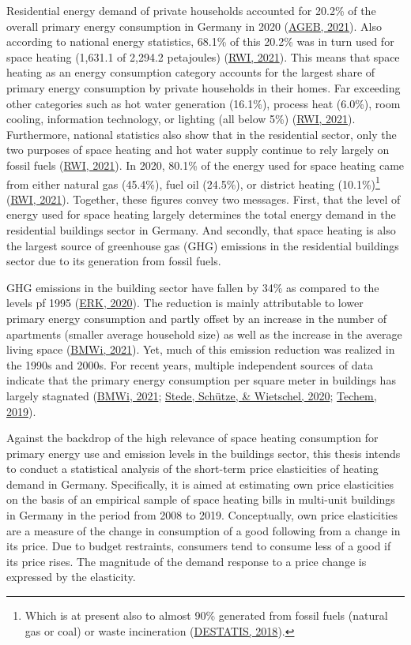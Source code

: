 \documentclass[12pt,twoside]{reedthesis}
\begin{document}
Residential energy demand of private households accounted for 20.2\% of the overall primary energy consumption in Germany in 2020 (\protect\hyperlink{ref-ageb21}{AGEB, 2021}). Also according to national energy statistics, 68.1\% of this 20.2\% was in turn used for space heating (1,631.1 of 2,294.2 petajoules) (\protect\hyperlink{ref-rwi21}{RWI, 2021}). This means that space heating as an energy consumption category accounts for the largest share of primary energy consumption by private households in their homes. Far exceeding other categories such as hot water generation (16.1\%), process heat (6.0\%), room cooling, information technology, or lighting (all below 5\%) (\protect\hyperlink{ref-rwi21}{RWI, 2021}). Furthermore, national statistics also show that in the residential sector, only the two purposes of space heating and hot water supply continue to rely largely on fossil fuels (\protect\hyperlink{ref-rwi21}{RWI, 2021}). In 2020, 80.1\% of the energy used for space heating came from either natural gas (45.4\%), fuel oil (24.5\%), or district heating (10.1\%)\footnote{Which is at present also to almost 90\% generated from fossil fuels (natural gas or coal) or waste incineration (\protect\hyperlink{ref-destatis18}{DESTATIS, 2018}).} (\protect\hyperlink{ref-rwi21}{RWI, 2021}). Together, these figures convey two messages. First, that the level of energy used for space heating largely determines the total energy demand in the residential buildings sector in Germany. And secondly, that space heating is also the largest source of greenhouse gas (GHG) emissions in the residential buildings sector due to its generation from fossil fuels.

GHG emissions in the building sector have fallen by 34\% as compared to the levels pf 1995 (\protect\hyperlink{ref-erk20}{ERK, 2020}). The reduction is mainly attributable to lower primary energy consumption and partly offset by an increase in the number of apartments (smaller average household size) as well as the increase in the average living space (\protect\hyperlink{ref-bmwi21}{BMWi, 2021}). Yet, much of this emission reduction was realized in the 1990s and 2000s. For recent years, multiple independent sources of data indicate that the primary energy consumption per square meter in buildings has largely stagnated (\protect\hyperlink{ref-bmwi21}{BMWi, 2021}; \protect\hyperlink{ref-stede_etal20}{Stede, Schütze, \& Wietschel, 2020}; \protect\hyperlink{ref-techem19}{Techem, 2019}).

Against the backdrop of the high relevance of space heating consumption for primary energy use and emission levels in the buildings sector, this thesis intends to conduct a statistical analysis of the short-term price elasticities of heating demand in Germany. Specifically, it is aimed at estimating own price elasticities on the basis of an empirical sample of space heating bills in multi-unit buildings in Germany in the period from 2008 to 2019. Conceptually, own price elasticities are a measure of the change in consumption of a good following from a change in its price. Due to budget restraints, consumers tend to consume less of a good if its price rises. The magnitude of the demand response to a price change is expressed by the elasticity.
\end{document}

